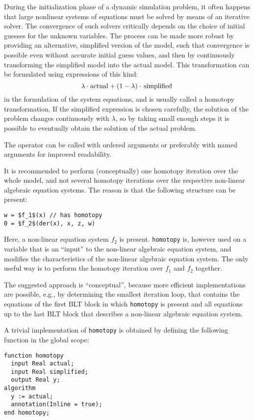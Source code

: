 \begin{nonnormative}
During the initialization phase of a dynamic simulation problem, it often happens that large nonlinear systems of equations must be solved by means of an iterative solver.
The convergence of such solvers critically depends on the choice of initial guesses for the unknown variables.
The process can be made more robust by providing an alternative, simplified version of the model, such that convergence is possible even without accurate initial guess values, and then by continuously transforming the simplified model into the actual model.
This transformation can be formulated using expressions of this kind:
\begin{equation*}
\lambda\cdot\text{\lstinline!actual!} + (1-\lambda)\cdot\text{\lstinline!simplified!}
\end{equation*}
in the formulation of the system equations, and is usually called a homotopy transformation.
If the simplified expression is chosen carefully, the solution of the problem changes continuously with $\lambda$, so by taking small enough steps it is possible to eventually obtain the solution of the actual problem.

The operator can be called with ordered arguments or preferably with named arguments for improved readability.

It is recommended to perform (conceptually) one homotopy iteration over the whole model, and not several homotopy iterations over the respective non-linear algebraic equation systems.
The reason is that the following structure can be present:
\begin{lstlisting}[language=modelica]
w = $f_1$(x) // has homotopy
0 = $f_2$(der(x), x, z, w)
\end{lstlisting}

Here, a non-linear equation system $f_2$ is present.
\lstinline!homotopy! is, however used on a variable that is an ``input'' to the non-linear algebraic equation system, and modifies the characteristics of the non-linear algebraic equation system.
The only useful way is to perform the homotopy iteration over $f_1$ and $f_2$ together.

The suggested approach is ``conceptual'', because more efficient implementations are possible, e.g., by determining the smallest iteration loop, that contains the equations of the first BLT block in which \lstinline!homotopy! is present and all equations up to the last BLT block that describes a non-linear algebraic equation system.

A trivial implementation of \lstinline!homotopy! is obtained by defining the following function in the global scope:
\begin{lstlisting}[language=modelica]
function homotopy
  input Real actual;
  input Real simplified;
  output Real y;
algorithm
  y := actual;
  annotation(Inline = true);
end homotopy;
\end{lstlisting}
\end{nonnormative}


